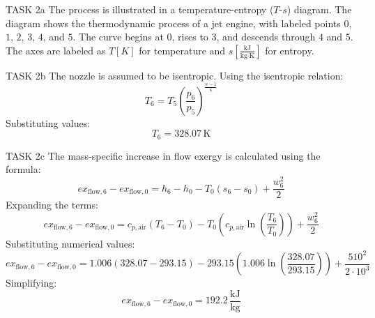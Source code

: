 TASK 2a  
The process is illustrated in a temperature-entropy (\( T \)-\( s \)) diagram. The diagram shows the thermodynamic process of a jet engine, with labeled points \( 0 \), \( 1 \), \( 2 \), \( 3 \), \( 4 \), and \( 5 \). The curve begins at \( 0 \), rises to \( 3 \), and descends through \( 4 \) and \( 5 \). The axes are labeled as \( T [K] \) for temperature and \( s [\frac{\text{kJ}}{\text{kg·K}}] \) for entropy.  

TASK 2b  
The nozzle is assumed to be isentropic. Using the isentropic relation:  
\[
T_6 = T_5 \left( \frac{p_6}{p_5} \right)^{\frac{\kappa-1}{\kappa}}
\]  
Substituting values:  
\[
T_6 = 328.07 \, \text{K}
\]  

TASK 2c  
The mass-specific increase in flow exergy is calculated using the formula:  
\[
ex_{\text{flow},6} - ex_{\text{flow},0} = h_6 - h_0 - T_0 (s_6 - s_0) + \frac{w_6^2}{2}
\]  
Expanding the terms:  
\[
ex_{\text{flow},6} - ex_{\text{flow},0} = c_{p,\text{air}} (T_6 - T_0) - T_0 \left( c_{p,\text{air}} \ln \left( \frac{T_6}{T_0} \right) \right) + \frac{w_6^2}{2}
\]  
Substituting numerical values:  
\[
ex_{\text{flow},6} - ex_{\text{flow},0} = 1.006 (328.07 - 293.15) - 293.15 \left( 1.006 \ln \left( \frac{328.07}{293.15} \right) \right) + \frac{510^2}{2 \cdot 10^3}
\]  
Simplifying:  
\[
ex_{\text{flow},6} - ex_{\text{flow},0} = 192.2 \, \frac{\text{kJ}}{\text{kg}}
\]